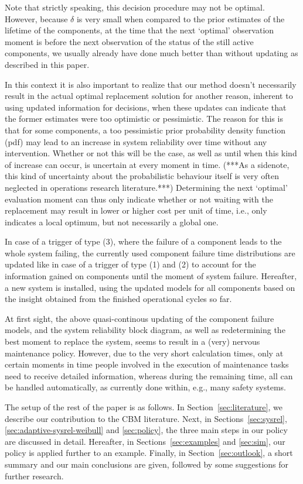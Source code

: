 \documentclass[authoryear]{elsarticle}
\begin{document}
Note that strictly speaking, this decision procedure may not be optimal.
However, because $\delta$ is very small when compared to the prior estimates of the lifetime of the components,
at the time that the next `optimal' observation moment is before the next observation of the status of the still active components,
we usually already have done much better than without updating as described in this paper.

In this context it is also important to realize that our method
doesn't necessarily result in the actual optimal replacement solution for another reason,
inherent to using updated information for decisions,
when these updates can indicate that the former estimates were too optimistic or pessimistic.
The reason for this is that for some components,
a too pessimistic prior probability density function (pdf)
may lead to an increase in system reliability over time without any intervention.
Whether or not this will be the case, as well as until when this kind of increase can occur,
is uncertain at every moment in time.
(***As a sidenote,
this kind of uncertainty about the probabilistic behaviour itself is very often neglected in operations research literature.***)
Determining the next `optimal' evaluation moment can thus only indicate whether or not waiting with the replacement
may result in lower or higher cost per unit of time,
i.e., only indicates a local optimum,
but not necessarily a global one.

In case of a trigger of type (3),
where the failure of a component leads to the whole system failing,
the currently used component failure time distributions are updated
like in case of a trigger of type (1) and (2)
to account for the information gained on components
until the moment of system failure.
Hereafter, a new system is installed,
using the updated models for all components based on the insight obtained from the finished operational cycles so far.

At first sight, the above quasi-continous updating of the component failure models,
and the system reliability block diagram,
as well as redetermining the best moment to replace the system,
seems to result in a (very) nervous maintenance policy.
However, due to the very short calculation times,
only at certain moments in time people involved in the execution of maintenance tasks
need to receive detailed information,
whereas during the remaining time,
all can be handled automatically, as currently done within, e.g., many safety systems. 

The setup of the rest of the paper is as follows.
In Section~\ref{sec:literature}, we describe our contribution to the CBM literature.
Next, in Sections~\ref{sec:sysrel}, \ref{sec:adaptive-sysrel-weibull} and \ref{sec:policy},
the three main steps in our policy are discussed in detail.
Hereafter, in Sections~\ref{sec:examples} and \ref{sec:sim},
our policy is applied further to an example.
Finally, in Section~\ref{sec:outlook},
a short summary and our main conclusions are given,
followed by some suggestions for further research.
\end{document}
